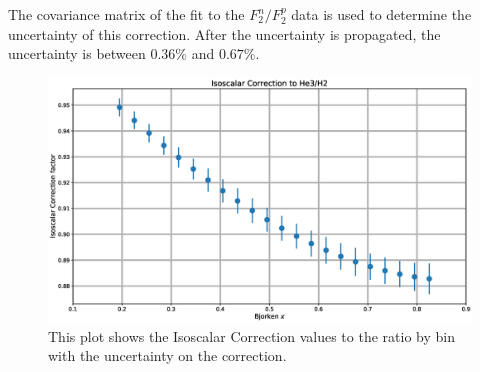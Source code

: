 The covariance matrix of the fit to the $F_2^n/F_2^p$ data is used to determine the uncertainty of this correction. After the uncertainty is propagated, the uncertainty is between $0.36\%$ and $0.67\%$.

\begin{figure}
	\includegraphics[width=\textwidth]{./analysis/fig/isocor.eps}
	\caption{This plot shows the Isoscalar Correction values to the  ratio by bin with the uncertainty on the correction.}
\end{figure}


